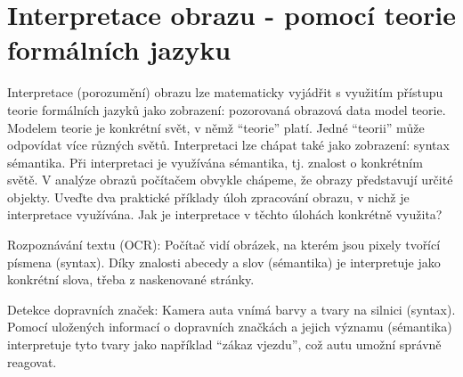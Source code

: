 \section{Interpretace obrazu - pomocí teorie formálních jazyku}
Interpretace (porozumění) obrazu lze matematicky vyjádřit s využitím přístupu teorie formálních jazyků jako 
zobrazení: pozorovaná obrazová data \texorpdfstring{\rightarrow}{→} model teorie. Modelem teorie je konkrétní svět, v 
němž \enquote{teorie} platí. Jedné \enquote{teorii} může odpovídat více různých světů. Interpretaci lze chápat také 
jako zobrazení: syntax \texorpdfstring{\rightarrow}{→} sémantika. Při interpretaci je využívána sémantika, tj. znalost 
o konkrétním světě. V analýze obrazů počítačem obvykle chápeme, že obrazy představují určité objekty. Uveďte dva 
praktické příklady úloh zpracování obrazu, v nichž je interpretace využívána. Jak je interpretace v těchto úlohách 
konkrétně využita?

Rozpoznávání textu (OCR): Počítač vidí obrázek, na kterém jsou pixely tvořící písmena (syntax). Díky znalosti abecedy 
a slov (sémantika) je interpretuje jako konkrétní slova, třeba z naskenované stránky.

Detekce dopravních značek: Kamera auta vnímá barvy a tvary na silnici (syntax). Pomocí uložených informací o dopravních 
značkách a jejich významu (sémantika) interpretuje tyto tvary jako například \enquote{zákaz vjezdu}, což autu umožní 
správně reagovat.
